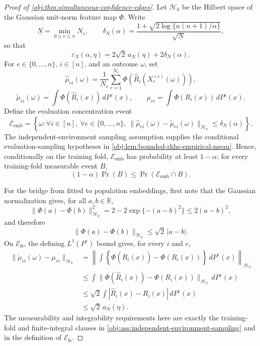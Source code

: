 \begin{proof}[Proof of \cref{obj:thm:simultaneous-confidence-edges}]
Let \(\mathcal H_k\) be the Hilbert space of the Gaussian unit-norm feature map
\(\Phi\).  Write
\[
\underline N=\min_{0\le e\le n}N_e,
\qquad
\delta_N(\alpha)=
\frac{1+\sqrt{2\log\{n(n+1)/\alpha\}}}{\sqrt{\underline N}},
\]
so that
\[
\varepsilon_N(\alpha,\eta)
=
2\sqrt 2\,a_N(\eta)+2\delta_N(\alpha).
\]
For \(e\in\{0,\ldots,n\}\), \(i\in[n]\), and an outcome \(\omega\), set
\[
\widehat\mu_{e i}(\omega)
=
\frac1{N_e}\sum_{r=1}^{N_e}
\Phi\!\left(\widehat R_i(X^{(e)}_r(\omega))\right),
\]
\[
\widetilde\mu_{e i}(\omega)
=
\int \Phi\!\left(\widehat R_i(x)\right)\,dP^e(x),
\qquad
\mu_{e i}
=
\int \Phi\!\left(R_i(x)\right)\,dP^e(x).
\]
Define the evaluation concentration event
\[
\mathcal E_{\mathrm{emb}}
=
\left\{
\omega:
\forall i\in[n],\ \forall e\in\{0,\ldots,n\},\
\|\widehat\mu_{e i}(\omega)-\widetilde\mu_{e i}(\omega)\|_{\mathcal H_k}
\le \delta_N(\alpha)
\right\}.
\]
The independent-environment sampling assumption supplies the conditional evaluation-sampling hypotheses in \cref{obj:lem:bounded-rkhs-empirical-mean}.  Hence, conditionally on the training fold, \(\mathcal E_{\mathrm{emb}}\) has probability at least \(1-\alpha\): for every training-fold measurable event \(B\),
\[
(1-\alpha)\Pr(B)
\le
\Pr(\mathcal E_{\mathrm{emb}}\cap B).
\]

For the bridge from fitted to population embeddings, first note that the Gaussian normalization gives, for all \(a,b\in\mathbb R\),
\[
\|\Phi(a)-\Phi(b)\|_{\mathcal H_k}^2
=
2-2\exp\{-(a-b)^2\}
\le 2(a-b)^2,
\]
and therefore
\[
\|\Phi(a)-\Phi(b)\|_{\mathcal H_k}
\le
\sqrt2\,|a-b|.
\]
On \(\mathcal E_{\mathrm{fs}}\), the defining \(L^1(P^e)\) bound gives, for every \(i\) and \(e\),
\[
\begin{aligned}
\|\widetilde\mu_{e i}(\omega)-\mu_{e i}\|_{\mathcal H_k}
&=
\left\|
\int
\left\{
\Phi(\widehat R_i(x))-\Phi(R_i(x))
\right\}
\,dP^e(x)
\right\|_{\mathcal H_k}                                                   \\
&\le
\int
\|\Phi(\widehat R_i(x))-\Phi(R_i(x))\|_{\mathcal H_k}
\,dP^e(x)                                                                 \\
&\le
\sqrt2
\int
|\widehat R_i(x)-R_i(x)|
\,dP^e(x)                                                                 \\
&\le
\sqrt2\,a_N(\eta).
\end{aligned}
\]
The measurability and integrability requirements here are exactly the training-fold and finite-integral clauses in \cref{obj:ass:independent-environment-sampling} and in the definition of \(\mathcal E_{\mathrm{fs}}\).


\end{proof}
